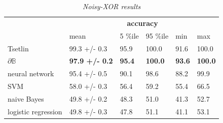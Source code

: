 \documentclass{article} %
\begin{document}
\begin{table}[h]
	\centering
	\begin{tabular}{llllll}
		\cline{2-6}
		\multicolumn{1}{c}{}                       & \multicolumn{5}{c}{\textbf{accuracy}}                                                                                                                                                            \\ \cline{2-6} 
		\multicolumn{1}{l|}{}                      & \multicolumn{1}{l|}{mean}                  & \multicolumn{1}{l|}{5 \%ile}       & \multicolumn{1}{l|}{95 \%ile}       & \multicolumn{1}{l|}{min}           & \multicolumn{1}{l|}{max}            \\ \hline
		\multicolumn{1}{|l|}{Tsetlin}              & \multicolumn{1}{l|}{99.3 +/- 0.3}          & \multicolumn{1}{l|}{95.9}          & \multicolumn{1}{l|}{100.0}          & \multicolumn{1}{l|}{91.6}          & \multicolumn{1}{l|}{100.0}          \\ \hline
		\multicolumn{1}{|l|}{$\partial\mathbb{B}$} & \multicolumn{1}{l|}{\textbf{97.9 +/- 0.2}} & \multicolumn{1}{l|}{\textbf{95.4}} & \multicolumn{1}{l|}{\textbf{100.0}} & \multicolumn{1}{l|}{\textbf{93.6}} & \multicolumn{1}{l|}{\textbf{100.0}} \\ \hline
		\multicolumn{1}{|l|}{neural network}       & \multicolumn{1}{l|}{95.4 +/- 0.5}          & \multicolumn{1}{l|}{90.1}          & \multicolumn{1}{l|}{98.6}           & \multicolumn{1}{l|}{88.2}          & \multicolumn{1}{l|}{99.9}           \\ \hline
		\multicolumn{1}{|l|}{SVM}                  & \multicolumn{1}{l|}{58.0 +/- 0.3}          & \multicolumn{1}{l|}{56.4}          & \multicolumn{1}{l|}{59.2}           & \multicolumn{1}{l|}{55.4}          & \multicolumn{1}{l|}{66.5}           \\ \hline
		\multicolumn{1}{|l|}{naive Bayes}          & \multicolumn{1}{l|}{49.8 +/- 0.2}          & \multicolumn{1}{l|}{48.3}          & \multicolumn{1}{l|}{51.0}           & \multicolumn{1}{l|}{41.3}          & \multicolumn{1}{l|}{52.7}           \\ \hline
		\multicolumn{1}{|l|}{logistic regression}  & \multicolumn{1}{l|}{49.8 +/- 0.3}          & \multicolumn{1}{l|}{47.8}          & \multicolumn{1}{l|}{51.1}           & \multicolumn{1}{l|}{41.1}          & \multicolumn{1}{l|}{53.1}           \\ \hline
	\end{tabular}
	\caption{{\em Noisy-XOR results}}
	\label{tab:noisy-xor-results}
\end{table}
\end{document}
